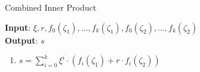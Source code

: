 \begin{algorithm}[H]
    \caption{Combined Inner Product}
    \textbf{Input}: $\xi, r, f_0(\zeta_1), \dots, f_k(\zeta_1), f_0(\zeta_2), \dots, f_k(\zeta_2)$ \\ %
    \textbf{Output}: $s$
    \begin{enumerate}
        \item $s = \sum\limits_{i = 0}^{k} \xi^i \cdot (f_i(\zeta_1) + r \cdot f_i(\zeta_2))$
    \end{enumerate}
\end{algorithm}